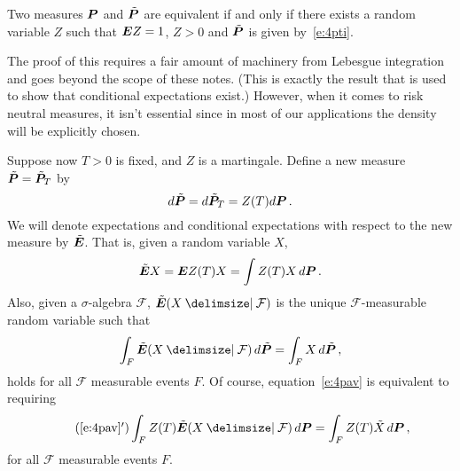 \begin{theorem}
  Two measures $\P$ and $\tilde\P$ are equivalent if and only if there exists a random variable $Z$ such that $\E Z = 1$, $Z > 0$ and $\tilde\P$ is given by~\eqref{e:4pti}.
\end{theorem}

The proof of this requires a fair amount of machinery from Lebesgue integration and goes beyond the scope of these notes. 
(This is exactly the result that is used to show that conditional expectations exist.)
However, when it comes to risk neutral measures, it isn't essential since in most of our applications the density will be explicitly chosen.

Suppose now $T>0$ is fixed, and $Z$ is a martingale.
Define a new measure $\tilde\P = \tilde\P_T$ by
\begin{equation*}
  d\tilde\P = d\tilde\P_T = Z(T) d\P\,.
\end{equation*}
We will denote expectations and conditional expectations with respect to the new measure by $\tilde \E$.
That is, given a random variable $X$,
\begin{equation*}
  \tilde\E X = \E Z(T) X = \int Z(T) X \, d\P\,.
\end{equation*}
Also, given a $\sigma$-algebra $\mathcal F$, $\tilde \E(X \given \mathcal F)$ is the unique $\mathcal F$-measurable random variable such that
\begin{equation}\label{e:4pav}
  \int_F \tilde \E (X \given \mathcal F) \, d\tilde\P
  = \int_F X  \, d\tilde\P\,,
\end{equation}
holds for all $\mathcal F$ measurable events $F$.
Of course, equation~\eqref{e:4pav} is equivalent to requiring
\begin{gather}\label{e:4pavPrime}
  \tag{\ref{e:4pav}$'$}
  \int_F Z(T) \tilde \E (X \given \mathcal F) \, d\P
  = \int_F Z(T) \tilde X  \, d\P\,,
\end{gather}
for all $\mathcal F$ measurable events $F$.


